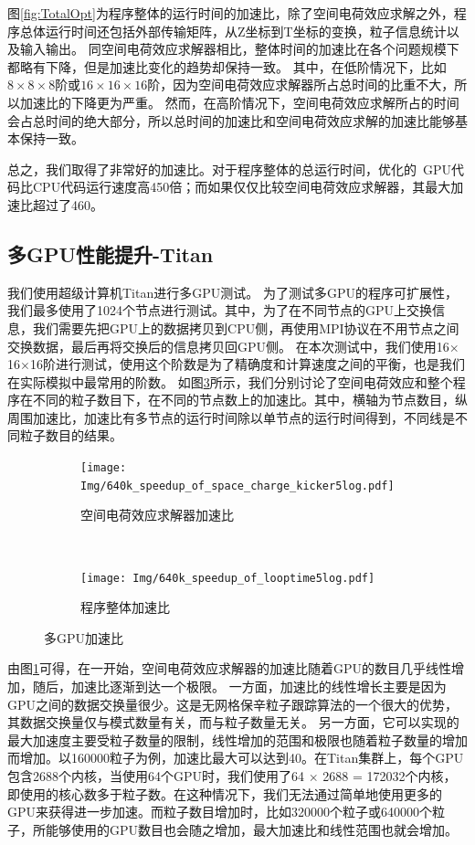 图\ref{fig:TotalOpt}为程序整体的运行时间的加速比，除了空间电荷效应求解之外，程序总体运行时间还包括外部传输矩阵，从Z坐标到T坐标的变换，粒子信息统计以及输入输出。
同空间电荷效应求解器相比，整体时间的加速比在各个问题规模下都略有下降，但是加速比变化的趋势却保持一致。
其中，在低阶情况下，比如$8\times8\times8$阶或$16\times16\times16$阶，因为空间电荷效应求解器所占总时间的比重不大，所以加速比的下降更为严重。
然而，在高阶情况下，空间电荷效应求解所占的时间会占总时间的绝大部分，所以总时间的加速比和空间电荷效应求解的加速比能够基本保持一致。

总之，我们取得了非常好的加速比。对于程序整体的总运行时间，优化的~GPU代码比CPU代码运行速度高450倍；而如果仅仅比较空间电荷效应求解器，其最大加速比超过了460。

\subsection{多GPU性能提升-Titan}
我们使用超级计算机Titan进行多GPU测试。
为了测试多GPU的程序可扩展性，我们最多使用了1024个节点进行测试。其中，为了在不同节点的GPU上交换信息，我们需要先把GPU上的数据拷贝到CPU侧，再使用MPI协议在不用节点之间交换数据，最后再将交换后的信息拷贝回GPU侧。
在本次测试中，我们使用16$\times$16$\times$16阶进行测试，使用这个阶数是为了精确度和计算速度之间的平衡，也是我们在实际模拟中最常用的阶数。
如图\ref{fig:Titan}所示，我们分别讨论了空间电荷效应和整个程序在不同的粒子数目下，在不同的节点数上的加速比。其中，横轴为节点数目，纵周围加速比，加速比有多节点的运行时间除以单节点的运行时间得到，不同线是不同粒子数目的结果。

\begin{figure}[!htb]
    \centering
    \begin{subfigure}[b]{0.9\textwidth}
        \texttt{[image: Img/640k\_speedup\_of\_space\_charge\_kicker5log.pdf]}
        \caption{空间电荷效应求解器加速比}
        \label{fig:SCTitan}
    \end{subfigure}
    \quad
    ~ %
    \begin{subfigure}[b]{0.9\textwidth}
        \texttt{[image: Img/640k\_speedup\_of\_looptime5log.pdf]}
        \caption{程序整体加速比}
        \label{fig:TotalTitan}
    \end{subfigure}
    \caption{多GPU加速比}\label{fig:Titan}
\end{figure}

由图\ref{fig:SCTitan}可得，在一开始，空间电荷效应求解器的加速比随着GPU的数目几乎线性增加，随后，加速比逐渐到达一个极限。
一方面，加速比的线性增长主要是因为GPU之间的数据交换量很少。这是无网格保辛粒子跟踪算法的一个很大的优势，其数据交换量仅与模式数量有关，而与粒子数量无关。
另一方面，它可以实现的最大加速度主要受粒子数量的限制，线性增加的范围和极限也随着粒子数量的增加而增加。以160000粒子为例，加速比最大可以达到40。在Titan集群上，每个GPU包含2688个内核，当使用64个GPU时，我们使用了64 $\times$ 2688 = 172032个内核，即使用的核心数多于粒子数。在这种情况下，我们无法通过简单地使用更多的GPU来获得进一步加速。而粒子数目增加时，比如320000个粒子或640000个粒子，所能够使用的GPU数目也会随之增加，最大加速比和线性范围也就会增加。

